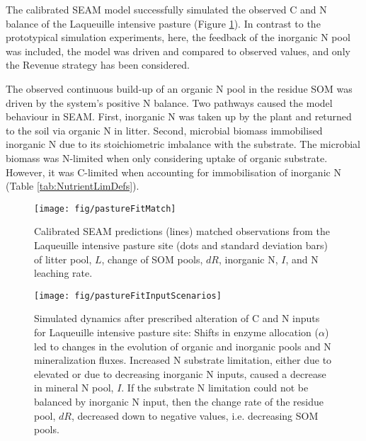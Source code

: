 The calibrated SEAM model successfully simulated the observed C and N balance of
the Laqueuille intensive pasture (Figure \ref{fig:pastureFitMatch}). In contrast
to the prototypical simulation experiments, here, the feedback of the inorganic
N pool was included, the model was driven and compared to observed values, and
only the Revenue strategy has been considered. 

The observed continuous build-up of an organic N pool in the residue SOM was
driven by the system's positive N balance. Two pathways caused the model
behaviour in SEAM. First, inorganic N was taken up by the plant and returned to
the soil via organic N in litter. Second, microbial biomass immobilised
inorganic N due to its stoichiometric imbalance with the substrate. The
microbial biomass was N-limited when only considering uptake of
organic substrate. However, it was C-limited when accounting for immobilisation
of inorganic N (Table \ref{tab:NutrientLimDefs}). 

\begin{figure}[t] \vspace*{2mm}
\begin{center}
\texttt{[image: fig/pastureFitMatch]} 
\end{center}
\caption{
Calibrated SEAM predictions (lines)  matched observations from the
Laqueuille intensive pasture site (dots and standard deviation bars) of
litter pool, $L$, change of SOM pools, $dR$, inorganic N, $I$, and N leaching rate.
\label{fig:pastureFitMatch}} 
\end{figure}

\begin{figure}[t] \vspace*{2mm}
\begin{center}
\texttt{[image: fig/pastureFitInputScenarios]} 
\end{center}
\caption{
Simulated dynamics after prescribed alteration of C and N inputs for Laqueuille
intensive pasture site: Shifts in enzyme allocation ($\alpha$) led to changes in
the evolution of organic and inorganic pools and N mineralization
fluxes. 
Increased N substrate limitation, either due to elevated  or due to
decreasing inorganic N inputs, caused a decrease in mineral N pool, $I$. If the
substrate N limitation could not be balanced by inorganic N input, then the
change rate of the residue pool, $dR$, decreased down to negative values, i.e.
decreasing SOM pools.
\label{fig:pastureFitScen}}  
\end{figure}   
   
